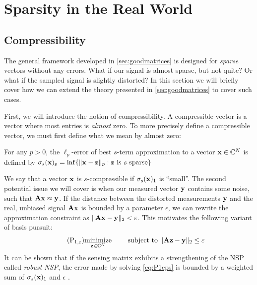 






\section{Sparsity in the Real World}
\subsection{Compressibility}
The general framework developed in \cref{sec:goodmatrices} is designed for \textit{sparse} vectors without any errors. What if our signal is almost sparse, but not quite? Or what if the sampled signal is slightly distorted? In this section we will briefly cover how we can extend the theory presented in \cref{sec:goodmatrices} to cover such cases.

First, we will introduce the notion of compressibility.
A compressible vector is a vector where most entries is \textit{almost} zero. To more precisely define a compressible vector, we must first define what we mean by almost zero:
\begin{definition} \label{def:compressibility}
	For any $ p > 0 $, the $ \ell_{p} $-error of best $ s $-term approximation to a vector $ \mathbf{x} \in \mathbb{C}^{N} $ is defined by
	\(
		\sigma_{s}(\mathbf{x})_{p} = \inf \{\lVert\mathbf{x} - \mathbf{z}\rVert_{p} : \mathbf{z} \text{ is } s\text{-sparse}\}
	\)
\end{definition}

We say that a vector $ \mathbf{x} $ is $ s $-compressible if $ \sigma_{s}(\mathbf{x})_{1} $ is ``small''. The second potential issue we will cover is when our measured vector $ \mathbf{y} $ contains some noise, such that $ \mathbf{A}\mathbf{x} \approx \mathbf{y} $. If the distance between the distorted measurements $ \mathbf{y} $ and the real, unbiased signal $ \mathbf{A}\mathbf{x} $ is bounded by a parameter $ \epsilon $, we can rewrite the approximation constraint as $ \lVert\mathbf{A}\mathbf{x} - \mathbf{y}\rVert_{2} < \varepsilon $. This motivates the following variant of basis pursuit:
\begin{equation}
	\tag{P$_{1, \epsilon}$}
	\label{eq:P1eps}
	\minimize{\z\in\Cx^{N}} \quad\subjectto \norm{\A\z - \y}_{2} \leq \epsilon
\end{equation}
It can be shown that if the sensing matrix exhibits a strengthening of the NSP called \textit{robust NSP}, the error made by solving \eqref{eq:P1eps} is bounded by a weighted sum of $ \sigma_{s}(\mathbf{x})_{1} $ and $ \epsilon $ \cite[Section~4.3]{foucart13intro}.




